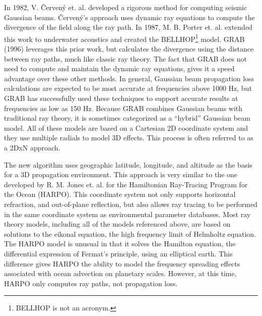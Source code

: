 \documentclass{ws-jca}
\newcommand{\threeD}{3\nobreakdash\textendash D }	%
\newcommand{\twoD}{2\nobreakdash\textendash D }	%
\newcommand{\twoDxN}{2\nobreakdash\textendash DxN }
\newcommand{\Cerveny}{\v{C}erven\'{y} }
\begin{document}
In 1982, V. \Cerveny et. al.\cite {Cerveny1982} developed a rigorous method for
computing seismic Gaussian beams. \v{C}erven\'{y}'s approach uses dynamic ray
equations to compute the divergence of the field along the ray path. In
1987, M. B. Porter et. al.\cite{Porter1994,Porter1987} extended this work to underwater
acoustics and created the BELLHOP\footnote{BELLHOP is not an acronym.}
model. GRAB (1996) leverages this prior work,
but calculates the divergence using the distance between ray paths, much
like classic ray theory. The fact that GRAB does not need to compute and
maintain the dynamic ray equations, gives it a speed advantage over these
other methods. In general, Gaussian
beam propagation loss calculations are expected to be most accurate at
frequencies above 1000 Hz, but GRAB has successfully used these techniques
to support accurate results at frequencies as low as 150 Hz. Because GRAB
combines Gaussian beams with traditional ray theory, it is sometimes
categorized as a ``hybrid'' Gaussian beam model. All of these models are based
on a Cartesian \twoD coordinate system and they use multiple radials to
model \threeD effects. This process is often referred to as a \twoDxN
approach.

The new algorithm uses geographic latitude, longitude, and altitude as the
basis for a \threeD propagation environment. This approach is very similar to the one
developed by R. M. Jones et. al.\cite{Jones1986} for the Hamiltonian
Ray-Tracing Program for the Ocean (HARPO). This coordinate system not only
supports horizontal refraction, and out-of-plane reflection, but also allows ray
tracing to be performed in the same coordinate system as environmental
parameter databases. Most ray theory models, including all of the models
referenced above, are based on solutions to the eikonal equation, the high
frequency limit of Helmholtz equation. The HARPO model is unusual in that it
solves the Hamilton equation, the differential expression of Fermat's
principle, using an elliptical earth. This difference gives HARPO the
ability to model the frequency spreading effects associated with ocean
advection on planetary scales. However, at this time, HARPO only computes ray
paths, not propagation loss.
\end{document}
